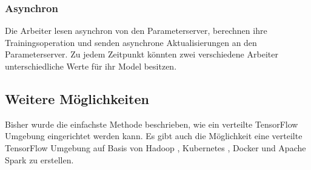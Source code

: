\subsubsection{Asynchron}
Die Arbeiter lesen asynchron von den Parameterserver, berechnen ihre Trainingsoperation und senden asynchrone Aktualisierungen an den Parameterserver. Zu jedem Zeitpunkt könnten zwei verschiedene Arbeiter unterschiedliche Werte für ihr Model besitzen.

\subsection{Weitere Möglichkeiten}
Bisher wurde die einfachste Methode beschrieben, wie ein verteilte TensorFlow Umgebung eingerichtet werden kann. Es gibt auch die Möglichkeit eine verteilte TensorFlow Umgebung auf Basis von Hadoop \cite{tensorflowhadoop}, Kubernetes \cite{tensorflowkubernetes}, Docker \cite{tensorflowdocker} und Apache Spark \cite{tensorflowspark} zu erstellen.




